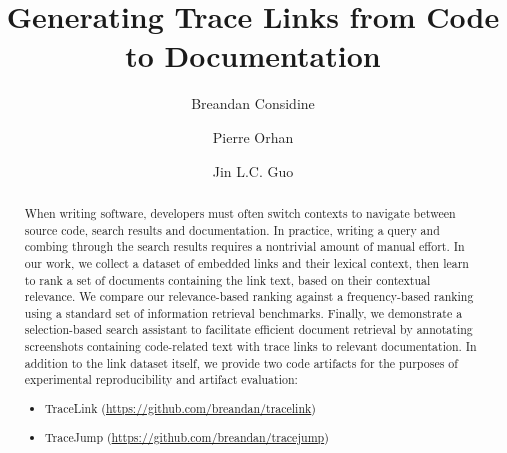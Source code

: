 \documentclass[sigconf,authordraft]{acmart}
\begin{document}
\title{Generating Trace Links from Code to Documentation}

\author{Breandan Considine}

\author{Pierre Orhan}

\author{Jin L.C. Guo}


\begin{abstract}
When writing software, developers must often switch contexts to navigate between source code, search results and documentation. In practice, writing a query and combing through the search results requires a nontrivial amount of manual effort. In our work, we collect a dataset of embedded links and their lexical context, then learn to rank a set of documents containing the link text, based on their contextual relevance. We compare our relevance-based ranking against a frequency-based ranking using a standard set of information retrieval benchmarks. Finally, we demonstrate a selection-based search assistant to facilitate efficient document retrieval by annotating screenshots containing code-related text with trace links to relevant documentation. In addition to the link dataset itself, we provide two code artifacts for the purposes of experimental reproducibility and artifact evaluation:

\begin{itemize}
    \item TraceLink (\href{https://github.com/breandan/tracelink}{https://github.com/breandan/tracelink})
    \item TraceJump (\href{https://github.com/breandan/tracejump}{https://github.com/breandan/tracejump})
\end{itemize}
\end{abstract}
\end{document}
